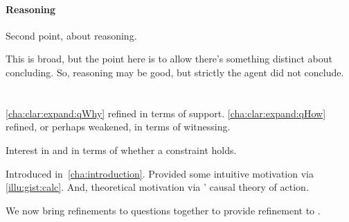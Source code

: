 \paragraph{Reasoning}

\begin{note}
  Second point, about reasoning.

  This is broad, but the point here is to allow there's something distinct about concluding.
  So, reasoning may be good, but strictly the agent did not conclude.
\end{note}


\newpage


\section{\issueInclusion{}}
\label{cha:clar:expand:issue}

\begin{note}
  \autoref{cha:clar:expand:qWhy} refined \qWhy{} in terms of support.
  \autoref{cha:clar:expand:qHow} refined, or perhaps weakened, \qHow{} in terms of witnessing.

  Interest in \qWhy{} and \qHow{} in terms of whether a constraint holds.

  \begin{quote}
    \vspace{-\baselineskip}
    \issueInclusionFirst*
  \end{quote}

  Introduced in~\autoref{cha:introduction}.
  Provided some intuitive motivation via \autoref{illu:gist:calc}.
  And, theoretical motivation via \citeauthor{Davidson:1963aa}' causal theory of action.

  We now bring refinements to questions together to provide refinement to \issueInclusion{}.
\end{note}

